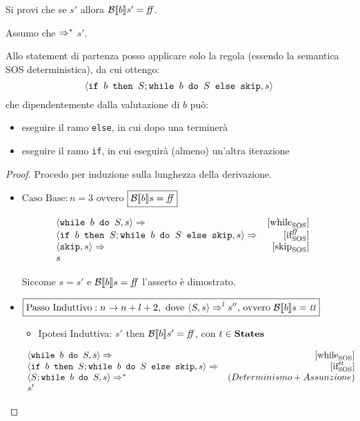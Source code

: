          {
           Si provi che se  \Rar{*} $s'$ allora
           $\B{b}' = \semfalse$.
         }
         {
           Assumo che  $\Rar{*}$ $s'$.

            Allo statement di partenza posso applicare solo la regola \whileSOS 
            (essendo la semantica SOS deterministica), da cui ottengo:  
           $$
            \confSs{\ifABC{b}{S; \wbS{b}{S}}{\skipForFriends}}{s} 
           $$
            che dipendentemente dalla valutazione di $b$ può: 
            \begin{itemize}
               \item eseguire il ramo \texttt{else}, in cui dopo una 
               \skipForFriends{} terminerà 
               \item eseguire il ramo \texttt{if}, in cui eseguirà (almeno) 
               un'altra iterazione
            \end{itemize}
           \begin{proof}
                        Procedo per induzione sulla lunghezza della derivazione.

           \begin{itemize}
             \item $\boxed{\text{Caso Base}: n = 3}$ ovvero 
           $\boxed{\B{b} = \semfalse}$ 

          $$
          \begin{array}{lrr}
    \confSs{\wbS{b}{S}}{s} \Rar{} & \whileSOS & \\
    \confSs{\ifABC{b}{S; \wbS{b}{S}}{\skipForFriends}}{s} \Rar{} & \ifffSOS & \\
    \confSs{\skipForFriends}{s} \Rar{} & \skipSOS & \\
    s & & \\
          \end{array}
          $$

           Siccome $s = s'$ e $\B{b} = \semfalse$ l'asserto è dimostrato.

           \item $\boxed{\text{Passo Induttivo}: n \rightarrow n + l + 2,
             \text{ dove } \confSs{S}{s} \Rar{l} s'' \text{, ovvero } \B{b} = \semtrue}$
             \begin{itemize}
               \item Ipotesi Induttiva:  
                $s'$ then $\B{b}' = \semfalse$, con $t\in\states$
             \end{itemize}
          $$
          \begin{array}{lrr}
    \confSs{\wbS{b}{S}}{s} \Rar{} & \whileSOS & \\
    \confSs{\ifABC{b}{S; \wbS{b}{S}}{\skipForFriends}}{s} \Rar{} & \ifttSOS & \\
    \confSs{S; \wbS{b}{S}}{s} \Rar{*} & (Determinismo + Assunzione) & \\
    s' & & \\
          \end{array}
          $$


\end{itemize}
\end{proof}}
